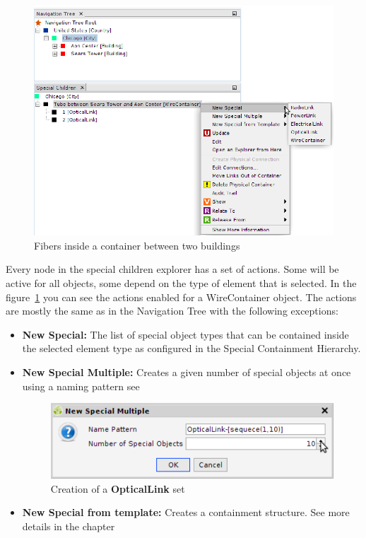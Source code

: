 \documentclass[a4paper]{article}
\begin{document}
		\begin{figure}[h!]
			\centering
			\includegraphics[width=0.7\linewidth]{img/navigation_tree_special_children_explorer.png}
			\caption{Fibers inside a container between two buildings}
			\label{fig:navigation_tree_special_children_explorer}
		\end{figure}
		
		Every node in the special children explorer has a set of actions. Some will be active for all objects, some depend on the type of element that is selected. In the figure~\ref{fig:navigation_tree_special_children_explorer} you can see the actions enabled for a WireContainer object. The actions are mostly the same as in the Navigation Tree with the following exceptions:
		
		\begin{itemize}
			\item \textbf{New Special:} The list of special object types that can be contained inside the selected element type as configured in the Special Containment Hierarchy.
			\item \textbf{New Special Multiple:} Creates a given number of special objects at once using a naming pattern see \textbf{}
			\begin{figure}[h!]
				\centering
				\includegraphics[width=0.5\linewidth]{img/new_special_multiple.png}
				\caption{Creation of a \textbf{OpticalLink} set}
				\label{fig:new_special_multiple}
			\end{figure}			
			\item \textbf{New Special from template:} Creates a containment structure. See more details in the chapter \textbf{}
		\end{itemize}
					
\end{document}
